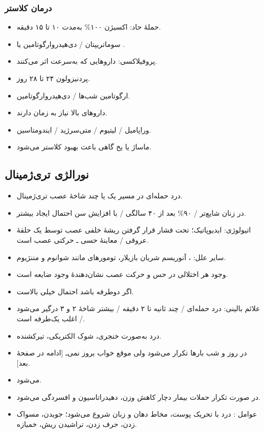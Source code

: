 \subsubsection{درمان کلاستر}
\begin{itemize}
\item حملهٔ حاد: اکسیژن ۱۰۰\% به‌مدت ۱۰ تا ۱۵ دقیقه.
\item سوماتریپتان  / دی‌هیدروارگوتامین  یا .
\item پروفیلاکسی: داروهایی که به‌سرعت اثر می‌کنند.
\item پردنیزولون ۲۴ تا ۲۸ روز.
\item ارگوتامین   شب‌ها / دی‌هیدروارگوتامین.
\item داروهای بالا نیاز به زمان دارند.
\item وراپامیل / لیتیوم / متی‌سرژید / ایندومتاسین.
\item ماساژ یا یخ گاهی باعث بهبود کلاستر می‌شود.
\end{itemize}
\subsection{نورالژی تری‌ژمینال}
\begin{itemize}
\item درد حمله‌ای در مسیر یک یا چند شاخهٔ عصب تری‌ژمینال.
\item در زنان شایع‌تر / ۹۰\% بعد از ۴۰ سالگی / با افزایش سن احتمال ایجاد بیشتر.
\item اتیولوژی: ایدیوپاتیک؛ تحت فشار قرار گرفتن ریشهٔ خلفی عصب توسط یک حلقهٔ عروقی / معاینهٔ حسی ـ حرکتی عصب  است.
\item سایر علل: ، آنوریسم شریان بازیلار، تومورهای  مانند شوانوم و مننژیوم.
\item وجود هر اختلالی در حس و حرکت عصب نشان‌دهندهٔ وجود ضایعه است.
\item اگر دوطرفه باشد احتمال  خیلی بالاست.
\item علائم بالینی: درد حمله‌ای / چند ثانیه تا ۲ دقیقه / بیشتر شاخهٔ ۲ و ۳ درگیر می‌شود / اغلب یک‌طرفه است.
\item درد به‌صورت خنجری، شوک الکتریکی، تیرکشنده.
\item در روز و شب بارها تکرار می‌شود ولی موقع خواب بروز نمی‌ـ [ادامه در صفحهٔ بعد].
\end{itemize}

\begin{itemize}
\item [ادامهٔ جملهٔ صفحهٔ قبل:] می‌شود.
\item در صورت تکرار حملات بیمار دچار کاهش وزن، دهیدراتاسیون و افسردگی می‌شود.
\item عوامل : درد با تحریک پوست، مخاط دهان و زبان شروع می‌شود؛ جویدن، مسواک زدن، حرف زدن، تراشیدن ریش، خمیازه.
\end{itemize}
